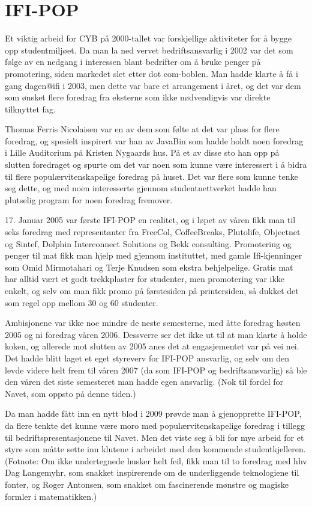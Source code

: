 \chapter{IFI-POP}

\author{Skrevet av Arne Hassel, godt hjulpet av Thomas Ferris Nicolaisen}

Et viktig arbeid for CYB på 2000-tallet var forskjellige aktiviteter for å bygge opp studentmiljøet. Da man la ned vervet bedriftsansvarlig i 2002 var det som følge av en nedgang i interessen blant bedrifter om å bruke penger på promotering, siden markedet slet etter dot com-boblen. Man hadde klarte å få i gang dagen@ifi i 2003, men dette var bare et arrangement i året, og det var dem som ønsket flere foredrag fra eksterne som ikke nødvendigvis var direkte tilknyttet fag.

Thomas Ferris Nicolaisen var en av dem som følte at det var plass for flere foredrag, og spesielt inspirert var han av JavaBin som hadde holdt noen foredrag i Lille Auditorium på Kristen Nygaards hus. På et av disse sto han opp på slutten foredraget og spurte om det var noen som kunne være interessert i å bidra til flere populærvitenskapelige foredrag på huset. Det var flere som kunne tenke seg dette, og med noen interesserte gjennom studentnettverket hadde han plutselig program for noen foredrag fremover.

17. Januar 2005 var første IFI-POP en realitet, og i løpet av våren fikk man til seks foredrag med representanter fra FreeCol, CoffeeBreaks, Plutolife, Objectnet og Sintef, Dolphin Interconnect Solutions og Bekk consulting. Promotering og penger til mat fikk man hjelp med gjennom instituttet, med gamle Ifi-kjenninger som Omid Mirmotahari og Terje Knudsen som ekstra behjelpelige. Gratis mat har alltid vært et godt trekkplaster for studenter, men promotering var ikke enkelt, og selv om man fikk promo på førstesiden på printersiden, så dukket det som regel opp mellom 30 og 60 studenter.

Ambisjonene var ikke noe mindre de neste semesterne, med åtte foredrag høsten 2005 og ni foredrag våren 2006. Dessverre ser det ikke ut til at man klarte å holde koken, og allerede mot slutten av 2005 anes det at engasjementet var på vei nei. Det hadde blitt laget et eget styreverv for IFI-POP ansvarlig, og selv om den levde videre helt frem til våren 2007 (da som IFI-POP og bedriftsansvarlig) så ble den våren det siste semesteret man hadde egen ansvarlig. (Nok til fordel for Navet, som oppsto på denne tiden.)

Da man hadde fått inn en nytt blod i 2009 prøvde man å gjenopprette IFI-POP, da flere tenkte det kunne være moro med populærvitenskapelige foredrag i tillegg til bedriftspresentasjonene til Navet. Men det viste seg å bli for mye arbeid for et styre som måtte sette inn klutene i arbeidet med den kommende studentkjelleren. (Fotnote: Om ikke undertegnede husker helt feil, fikk man til to foredrag med hhv Dag Langemyhr, som snakket inspirerende om de underliggende teknologiene til fonter, og Roger Antonsen, som snakket om fascinerende mønstre og magiske formler i matematikken.)

